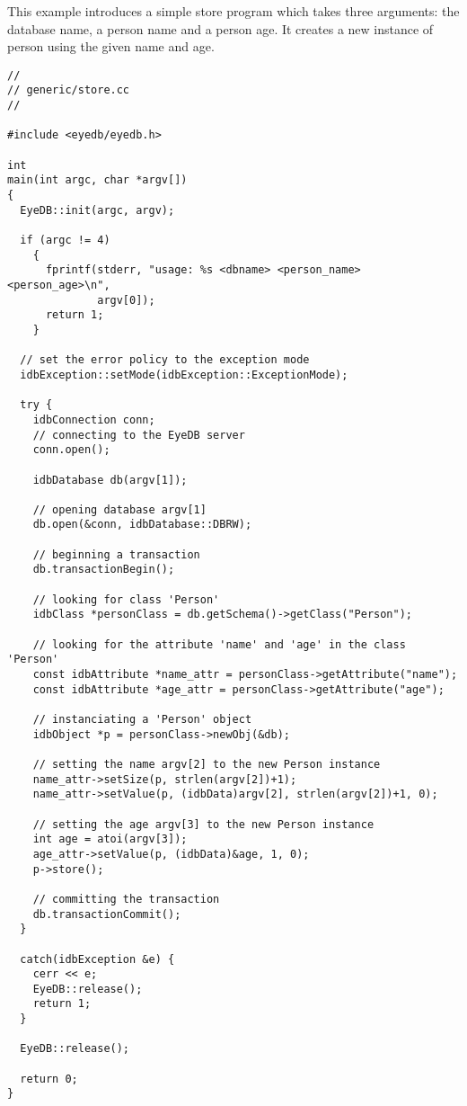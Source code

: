 \normalsize
{}
This example introduces a simple store program which takes
three arguments: the database name, a person name and a person age. It
creates a new instance of person using the given name and age.
\verbsize
\begin{verbatim}
//
// generic/store.cc
//

#include <eyedb/eyedb.h>

int
main(int argc, char *argv[])
{
  EyeDB::init(argc, argv);

  if (argc != 4)
    {
      fprintf(stderr, "usage: %
              argv[0]);
      return 1;
    }

  // set the error policy to the exception mode
  idbException::setMode(idbException::ExceptionMode);

  try {
    idbConnection conn;
    // connecting to the EyeDB server
    conn.open();

    idbDatabase db(argv[1]);

    // opening database argv[1]
    db.open(&conn, idbDatabase::DBRW);

    // beginning a transaction
    db.transactionBegin();

    // looking for class 'Person'
    idbClass *personClass = db.getSchema()->getClass("Person");

    // looking for the attribute 'name' and 'age' in the class 'Person'
    const idbAttribute *name_attr = personClass->getAttribute("name");
    const idbAttribute *age_attr = personClass->getAttribute("age");

    // instanciating a 'Person' object
    idbObject *p = personClass->newObj(&db);

    // setting the name argv[2] to the new Person instance
    name_attr->setSize(p, strlen(argv[2])+1);
    name_attr->setValue(p, (idbData)argv[2], strlen(argv[2])+1, 0);

    // setting the age argv[3] to the new Person instance
    int age = atoi(argv[3]);
    age_attr->setValue(p, (idbData)&age, 1, 0);
    p->store();

    // committing the transaction
    db.transactionCommit();
  }

  catch(idbException &e) {
    cerr << e;
    EyeDB::release();
    return 1;
  }

  EyeDB::release();

  return 0;
}
\end{verbatim}
\normalsize


